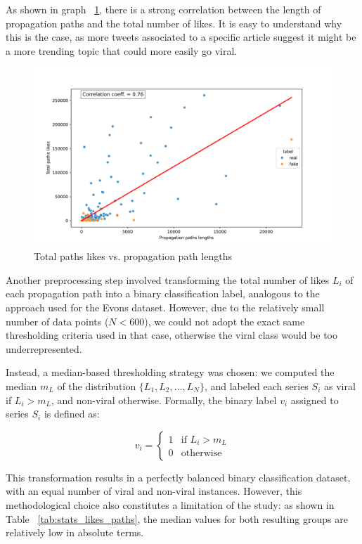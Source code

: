 \documentclass[a4paper,twoside,12pt]{book}
\begin{document}
As shown in graph ~\ref{fig:corr_likes_len}, there is a strong correlation between the length of propagation paths and the total number of likes. It is easy to understand why this is the case, as more tweets associated to a specific article suggest it might be a more trending topic that could more easily go viral. 

\pagebreak

\begin{figure}[h!]
	\centering
	\includegraphics[width=\textwidth]{./img/scatter_plot_with_regression_colored.png}
	\caption{Total paths likes vs. propagation path lengths}
	\label{fig:corr_likes_len}
\end{figure}

Another preprocessing step involved transforming the total number of likes $L_i$ of each propagation path into a binary classification label, analogous to the approach used for the Evons dataset. However, due to the relatively small number of data points ($N < 600$), we could not adopt the exact same thresholding criteria used in that case, otherwise the viral class would be too underrepresented.

Instead, a median-based thresholding strategy was chosen: we computed the median $m_L$ of the distribution $\{ L_1, L_2, \dots, L_N \}$, and labeled each series $S_i$ as viral if $L_i > m_L$, and non-viral otherwise. Formally, the binary label $v_i$ assigned to series $S_i$ is defined as:

$$
v_i =
\begin{cases}
	1 & \text{if } L_i > m_L \\
	0 & \text{otherwise}
\end{cases}
$$

This transformation results in a perfectly balanced binary classification dataset, with an equal number of viral and non-viral instances. However, this methodological choice also constitutes a limitation of the study: as shown in Table ~\ref{tab:stats_likes_paths}, the median values for both resulting groups are relatively low in absolute terms. \\
\end{document}

